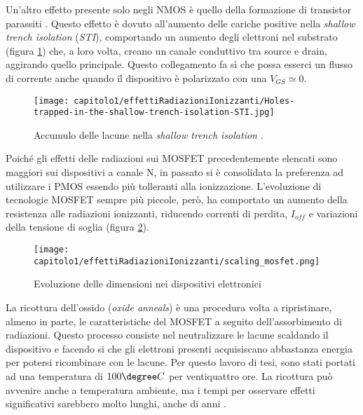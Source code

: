 \vspace{0.5cm}

Un'altro effetto presente solo negli NMOS è quello della formazione di transistor parassiti \cite{effetti_radiazioni:CMOS_IC_radiation_hardening_by_design}. Questo effetto è dovuto all'aumento delle cariche positive nella \textit{shallow trench isolation} (\textit{STI}), comportando un aumento degli elettroni nel substrato (figura \ref{fig:accumulo_lacune_STI}) che, a loro volta, creano un canale conduttivo tra source e drain, aggirando quello principale. Questo collegamento fa sì che possa esserci un flusso di corrente anche quando il dispositivo è polarizzato con una $V_{GS} \simeq 0$.

\begin{figure}[ht]
	\centering

	\texttt{[image: capitolo1/effettiRadiazioniIonizzanti/Holes-trapped-in-the-shallow-trench-isolation-STI.jpg]}

	\caption[Lacune nella \textit{STI}]{Accumulo delle lacune nella \textit{shallow trench isolation} \cite{effetti_radiazioni:CMOS_IC_radiation_hardening_by_design}.}
	\label{fig:accumulo_lacune_STI}

\end{figure}

Poiché gli effetti delle radiazioni sui MOSFET precedentemente elencati sono maggiori sui dispositivi a canale N, in passato si è consolidata la preferenza ad utilizzare i PMOS essendo più tolleranti alla ionizzazione. L'evoluzione di tecnologie MOSFET sempre più piccole, però, ha comportato un aumento della resistenza alle radiazioni ionizzanti, riducendo correnti di perdita, $I_{off}$ e variazioni della tensione di soglia (figura \ref{fig:scaling_mosfet}).  

\begin{figure}[ht]
	\centering

	\texttt{[image: capitolo1/effettiRadiazioniIonizzanti/scaling\_mosfet.png]}
	\caption[Scaling dei dispositivi elettroni]{Evoluzione delle dimensioni nei dispositivi elettronici \cite{effetti_radiazioni_scaling:Nanoelectronics_and_nanolithography}}
	\label{fig:scaling_mosfet}
\end{figure}


\vspace{0.5cm}

La ricottura dell'ossido (\textit{oxide anneals}) è una procedura volta a ripristinare, almeno in parte, le caratteristiche del MOSFET a seguito dell'assorbimento di radiazioni.
Questo processo consiste nel neutralizzare le lacune scaldando il dispositivo e facendo si che gli elettroni presenti acquisiscano abbastanza energia per potersi ricombinare con le lacune. Per questo lavoro di tesi, sono stati portati ad una temperatura di $100\degree C$ per ventiquattro ore. La ricottura può avvenire anche a temperatura ambiente, ma i tempi per osservare effetti significativi sarebbero molto lunghi, anche di anni \cite{bib:Effetti_Radiazioni_NASA}. 

